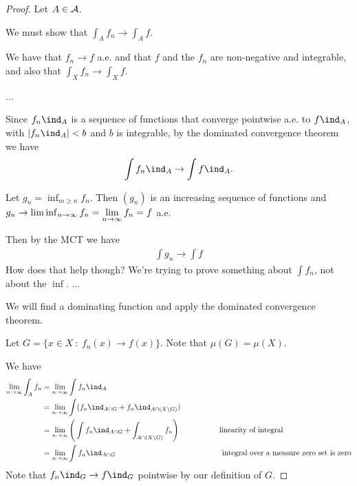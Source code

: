 \begin{proof}
  Let $A \in \mathcal A$.

  We must show that $\int_A f_n \to \int_A f$.

  We have that $f_n \to f$ a.e. and that $f$ and the $f_n$ are non-negative and integrable, and also
  that $\int_X f_n \to \int_X f$.


  ...


  Since $f_n\ind_{A}$ is a sequence of functions that converge pointwise a.e. to $f\ind_A$,
  with $|f_n\ind_A| < b$ and $b$ is integrable, by the dominated convergence theorem we have
  \begin{align*}
    \int f_n\ind_A \to \int f\ind_A.
  \end{align*}





  Let $g_n = \inf_{m \geq n} f_n$. Then $(g_n)$ is an increasing sequence of functions
  and $g_n \to \liminf_{n \to \infty} f_n = \limn f_n = f$ a.e.

  Then by the MCT we have
  \begin{align*}
    \int g_n \to \int f
  \end{align*}
  How does that help though? We're trying to prove something about $\int f_n$, not about the $\inf$.
  ...








  We will find a dominating function and apply the dominated convergence theorem.





  Let $G = \{x \in X ~:~ f_n(x) \to f(x)\}$. Note that $\mu(G) = \mu(X)$.

  We have
  \begin{align*}
    \limn \int_A f_n
    &= \limn \int f_n \ind_{A} \\
    &= \limn \int (f_n \ind_{A \cap G} + f_n \ind_{A \cap (X \setminus G)}) \\
    &= \limn \Bigg(\int f_n \ind_{A \cap G} + \int_{A \cap (X \setminus G)} f_n\Bigg) ~~~~~~~~~~~~~~~~\text{linearity of integral}\\
    &= \limn \int f_n \ind_{A \cap G} ~~~~~~~~~~~~~~~~~~~~~~~~~~~~~~~~~~~~~~~~~~\text{integral over a measure zero set is zero}\\
  \end{align*}
  Note that $f_n\ind_G \to f\ind_G$ pointwise by our definition of $G$.

\end{proof}

